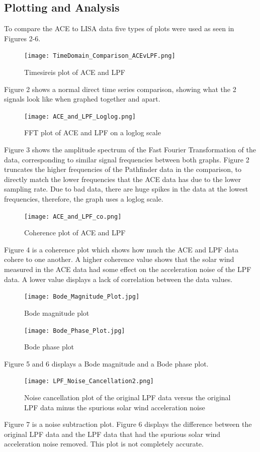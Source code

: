 \documentclass[%
 reprint,
 amsmath,amssymb,
 aps,
]{revtex4-2}
\begin{document}
\subsection{Plotting and Analysis}
To compare the ACE to LISA data five types of plots were used as seen in Figures 2-6. \\
\begin{figure}[htbp]
\centerline{\texttt{[image: TimeDomain\_Comparison\_ACEvLPF.png]}}
\caption{Timesireis plot of ACE and LPF}
\label{fig}
\end{figure}
Figure 2 shows a normal direct time series comparison, showing what the 2 signals look like when graphed together and apart.\\
\begin{figure}[htbp]
\centerline{\texttt{[image: ACE\_and\_LPF\_Loglog.png]}}
\caption{FFT plot of ACE and LPF on a loglog scale}
\label{fig}
\end{figure}
Figure 3 shows the amplitude spectrum of the Fast Fourier Transformation of the data, corresponding to similar signal frequencies between both graphs. Figure 2 truncates the higher frequencies of the Pathfinder data in the comparison, to directly match the lower frequencies that the ACE data has due to the lower sampling rate. Due to bad data, there are huge spikes in the data at the lowest frequencies, therefore, the graph uses a loglog scale.\\
\begin{figure}[htbp]
\centerline{\texttt{[image: ACE\_and\_LPF\_co.png]}}
\caption{Coherence plot of ACE and LPF}
\label{fig}
\end{figure}
Figure 4 is a coherence plot which shows how much the ACE and LPF data cohere to one another. A higher coherence value shows that the solar wind measured in the ACE data had some effect on the acceleration noise of the LPF data. A lower value displays a lack of correlation between the data values.\\
\begin{figure}[htbp]
\centerline{\texttt{[image: Bode\_Magnitude\_Plot.jpg]}}
\caption{Bode magnitude plot}
\label{fig}
\end{figure}
\begin{figure}[htbp]
\centerline{\texttt{[image: Bode\_Phase\_Plot.jpg]}}
\caption{Bode phase plot}
\label{fig}
\end{figure}
Figure 5 and 6 displays a Bode magnitude and a Bode phase plot. \\
\begin{figure}[htbp]
\centerline{\texttt{[image: LPF\_Noise\_Cancellation2.png]}}
\caption{Noise cancellation plot of the original LPF data versus the original LPF data minus the spurious solar wind acceleration noise}
\label{fig}
\end{figure}
Figure 7 is a noise subtraction plot. Figure 6 displays the difference between the original LPF data and the LPF data that had the spurious solar wind acceleration noise removed. This plot is not completely accurate.\\
\end{document}
